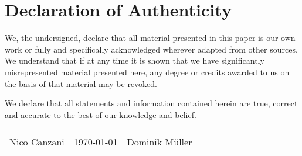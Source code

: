\chapter*{Declaration of Authenticity}

We, the undersigned, declare that all material presented in this paper is our own work or fully and specifically acknowledged wherever adapted from other sources.
We understand that if at any time it is shown that we have significantly misrepresented material presented here, any degree or credits awarded to us on the basis of that material may be revoked.

We declare that all statements and information contained herein are true, correct and accurate to the best of our knowledge and belief.

\vspace{1cm}
\begin{table}[h]
  \renewcommand{\arraystretch}{1.5}
  \begin{tabularx}{\textwidth}{C{5cm} >{\centering}X C{5cm}}
     &  & \\  
    Nico Canzani & \today & Dominik M\"uller \\
  \end{tabularx}
\end{table}
